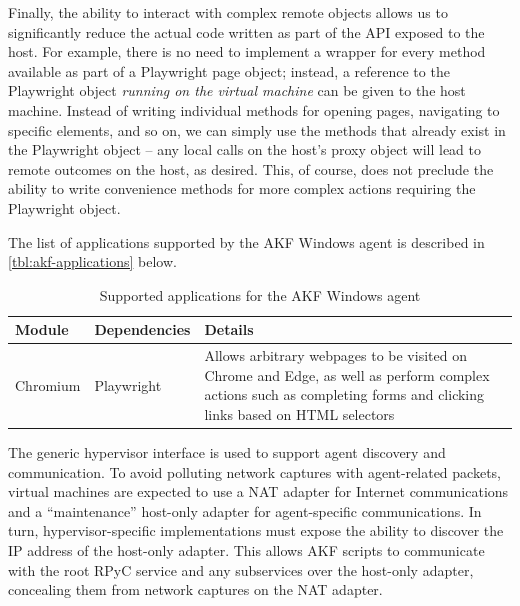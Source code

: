 \documentclass[letterpaper,12pt]{report}
\begin{document}
Finally, the ability to interact with complex remote objects allows us
to significantly reduce the actual code written as part of the API
exposed to the host. For example, there is no need to implement a
wrapper for every method available as part of a Playwright page object;
instead, a reference to the Playwright object \emph{running on the
virtual machine} can be given to the host machine. Instead of writing
individual methods for opening pages, navigating to specific elements,
and so on, we can simply use the methods that already exist in the
Playwright object -- any local calls on the host's proxy object will
lead to remote outcomes on the host, as desired. This, of course, does
not preclude the ability to write convenience methods for more complex
actions requiring the Playwright object.

The list of applications supported by the AKF Windows agent is described
in \autoref{tbl:akf-applications} below.


{
\small %
\begin{longtable}[]{@{}
  >{\raggedright\arraybackslash}p{}
  >{\raggedright\arraybackslash}p{}
  >{\raggedright\arraybackslash}p{}
@{}}
\caption{Supported applications for the AKF Windows agent}\label{tbl:akf-applications} \\
\toprule\noalign{}
\begin{minipage}[b]{\linewidth}\raggedright
Module
\end{minipage} & \begin{minipage}[b]{\linewidth}\raggedright
Dependencies
\end{minipage} & \begin{minipage}[b]{\linewidth}\raggedright
Details
\end{minipage} \\
\midrule\noalign{}
\endhead
\bottomrule\noalign{}
\endlastfoot
Chromium & Playwright \cite{MicrosoftPlaywrightpython2025} & Allows
arbitrary webpages to be visited on Chrome and Edge, as well as perform
complex actions such as completing forms and clicking links based on
HTML selectors \\
\end{longtable}
}


The generic hypervisor interface is used to support agent discovery and
communication. To avoid polluting network captures with agent-related
packets, virtual machines are expected to use a NAT adapter for Internet
communications and a ``maintenance'' host-only adapter for
agent-specific communications. In turn, hypervisor-specific
implementations must expose the ability to discover the IP address of
the host-only adapter. This allows AKF scripts to communicate with the
root RPyC service and any subservices over the host-only adapter,
concealing them from network captures on the NAT adapter.
\end{document}
